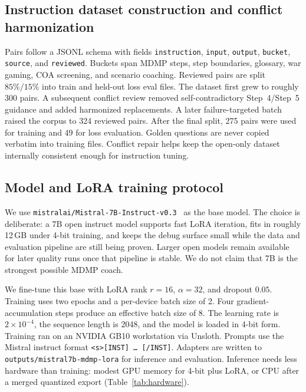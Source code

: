 \documentclass[11pt]{article}
\begin{document}
\subsection{Instruction dataset construction and conflict harmonization}
\label{sec:method-data}

Pairs follow a JSONL schema with fields
\texttt{instruction}, \texttt{input}, \texttt{output}, \texttt{bucket},
\texttt{source}, and \texttt{reviewed}.
Buckets span MDMP steps, step boundaries, glossary, war gaming, COA screening,
and scenario coaching.
Reviewed pairs are split $85\%/15\%$ into train and held-out loss eval files.
The dataset first grew to roughly 300 pairs.
A subsequent conflict review removed self-contradictory Step~4/Step~5 guidance
and added harmonized replacements.
A later failure-targeted batch raised the corpus to 324 reviewed pairs.
After the final split, 275 pairs were used for training and 49 for loss
evaluation.
Golden questions are never copied verbatim into training files.
Conflict repair helps keep the open-only dataset internally consistent enough
for instruction tuning.

\subsection{Model and LoRA training protocol}
\label{sec:method-train}

We use \texttt{mistralai/Mistral-7B-Instruct-v0.3}~\citep{mistral7b} as the base
model.
The choice is deliberate: a 7B open instruct model supports fast LoRA iteration,
fits in roughly 12\,GB under 4-bit training, and keeps the debug surface small
while the data and evaluation pipeline are still being proven.
Larger open models remain available for later quality runs once that pipeline
is stable.
We do not claim that 7B is the strongest possible MDMP coach.

We fine-tune this base with LoRA rank $r{=}16$, $\alpha{=}32$, and dropout
$0.05$.
Training uses two epochs and a per-device batch size of 2.
Four gradient-accumulation steps produce an effective batch size of 8.
The learning rate is $2{\times}10^{-4}$, the sequence length is 2048, and the
model is loaded in 4-bit form.
Training ran on an NVIDIA GB10 workstation via Unsloth.
Prompts use the Mistral instruct format
\texttt{<s>[INST] \ldots{} [/INST]}.
Adapters are written to \texttt{outputs/mistral7b-mdmp-lora} for inference and
evaluation.
Inference needs less hardware than training: modest GPU memory for 4-bit
plus LoRA, or CPU after a merged quantized export
(Table~\ref{tab:hardware}).
\end{document}
